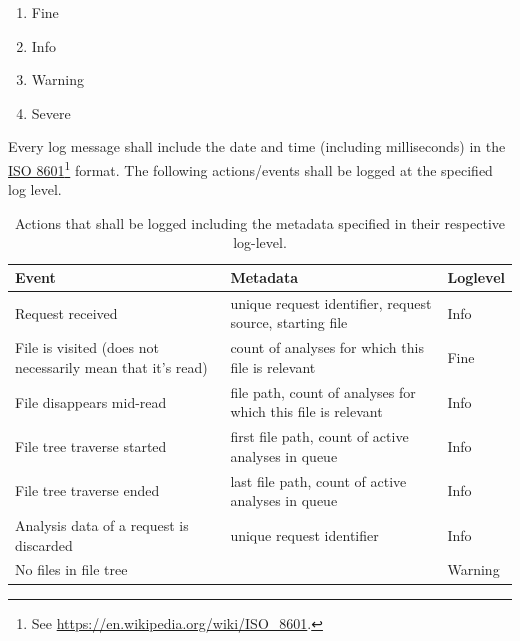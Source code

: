 \documentclass[11pt]{article} %
\begin{document}
    \begin{enumerate}
        \item Fine
        \item Info
        \item Warning
        \item Severe
    \end{enumerate}

    Every log message shall include the date and time (including milliseconds) in the \href{https://en.wikipedia.org/wiki/ISO_8601}{ISO 8601}\footnote{See \url{https://en.wikipedia.org/wiki/ISO_8601}.} format. The following actions/events shall be logged at the specified log level.

    \begin{table}[H]
        \centering
        \begin{tabular}{p{.2\linewidth} | p{.5\linewidth} | p{.2\linewidth}}
            \textbf{Event}                                             & \textbf{Metadata}                                            & \textbf{Loglevel} \\\hline
            Request received                                           & unique request identifier, request source, starting file     & Info              \\\hline
            File is visited (does not necessarily mean that it's read) & count of analyses for which this file is relevant                     & Fine              \\\hline
            File disappears mid-read                                   & file path, count of analyses for which this file is relevant                     & Info              \\\hline
            File tree traverse started                                 & first file path, count of active analyses in queue           & Info              \\\hline
            File tree traverse ended                                   & last file path, count of active analyses in queue            & Info              \\\hline
            Analysis data of a request is discarded                    & unique request identifier                                    & Info              \\\hline
            No files in file tree                                      &                                                              & Warning
        \end{tabular}
        \caption{Actions that shall be logged including the metadata specified in their respective log-level.}
        \label{tab:log_actions}
    \end{table}
\end{document}
